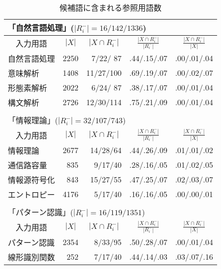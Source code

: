 \begin{table}
 \begin{center}\footnotesize
  \caption{候補語に含まれる参照用語数}\label{tbl:cand_result}
   \begin{tabular}{|l|rr|cc|}
    \multicolumn{5}{l}{「自然言語処理」($|R_i^{-}|=16/142/1336$)} \\
    \hline
    \multicolumn{1}{|c}{入力用語} & 
    \multicolumn{1}{|c}{$|X|$} &
    \multicolumn{1}{c|}{$|X\cap R_i^{-}|$} &
    \multicolumn{1}{c}{$\frac{|X\cap R_i^{-}|}{|R_i^{-}|}$} & 
    \multicolumn{1}{c|}{$\frac{|X\cap R_i^{-}|}{|X|}$}
    \\
    \hline
    自然言語処理 & 2250 & 7/22/ 87 & .44/.15/.07 & .00/.01/.04\\
    意味解析 &  1408 & 11/27/100 & .69/.19/.07 & .00/.02/.07\\
    形態素解析 & 2022 & 6/24/ 87 & .38/.17/.07 & .00/.01/.04\\
    構文解析 &  2726 & 12/30/114 & .75/.21/.09 & .00/.01/.04\\
    \hline
    \multicolumn{5}{l}{\tiny }\\[-5pt]
    \multicolumn{5}{l}{「情報理論」($|R_i^{-}|=32/107/743$)} \\
    \hline
    \multicolumn{1}{|c}{入力用語} & 
    \multicolumn{1}{|c}{$|X|$} &
    \multicolumn{1}{c|}{$|X\cap R_i^{-}|$} &
    \multicolumn{1}{c}{$\frac{|X\cap R_i^{-}|}{|R_i^{-}|}$} &
    \multicolumn{1}{c|}{$\frac{|X\cap R_i^{-}|}{|X|}$}
    \\
    \hline
    情報理論 &  2677 & 14/28/64  & .44/.26/.09 & .01/.01/.02\\
    通信路容量  & 835 & 9/17/40  & .28/.16/.05 & .01/.02/.05\\
    情報源符号化  & 843 & 15/27/55 & .47/.25/.07 & .02/.03/.07\\
    エントロピー  & 4176 & 5/17/40 & .16/.16/.05 & .00/.00/.01\\
    \hline
    \multicolumn{5}{l}{\tiny }\\[-5pt]
    \multicolumn{5}{l}{「パターン認識」($|R_i^{-}|=16/119/1351$)} \\
    \hline
    \multicolumn{1}{|c}{入力用語} & 
    \multicolumn{1}{|c}{$|X|$} &
    \multicolumn{1}{c|}{$|X\cap R_i^{-}|$} &
    \multicolumn{1}{c}{$\frac{|X\cap R_i^{-}|}{|R_i^{-}|}$} &
    \multicolumn{1}{c|}{$\frac{|X\cap R_i^{-}|}{|X|}$}
    \\
    \hline
    パターン認識 &  2354 & 8/33/95 & .50/.28/.07 & .00/.01/.04\\
    線形識別関数 &  252 & 7/17/40 & .44/.14/.03 & .03/.07/.16\\

\end{tabular}
\end{center}
\end{table}
